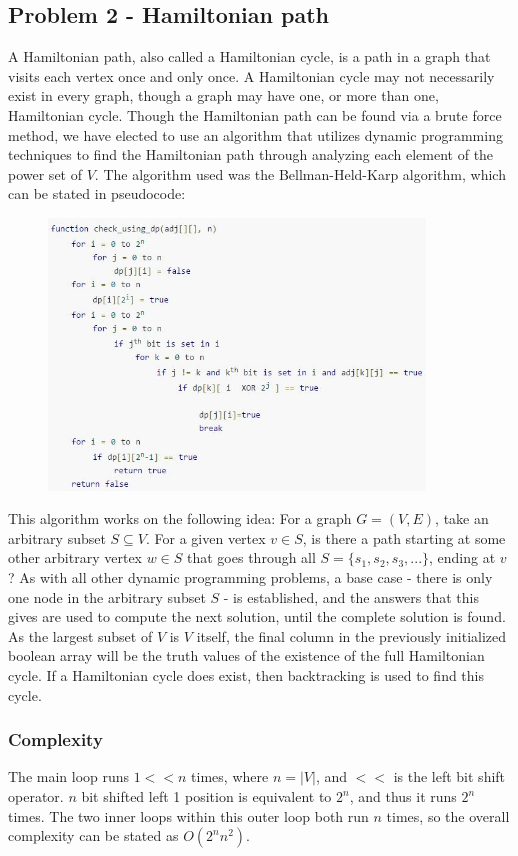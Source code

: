 \documentclass[11pt]{article}
\begin{document}
	\subsection{Problem 2 - Hamiltonian path}
	A Hamiltonian path, also called a Hamiltonian cycle, is a path in a graph that visits each vertex once and only once. A Hamiltonian cycle may not necessarily exist in every graph, though a graph may have one, or more than one, Hamiltonian cycle. Though the Hamiltonian path can be found via a brute force method, we have elected to use an algorithm that utilizes dynamic programming techniques to find the Hamiltonian path through analyzing each element of the power set of \(V\). The algorithm used was the Bellman-Held-Karp algorithm, which can be stated in pseudocode: \cite{hamilton} \newpage 
	 \begin{figure}[h!]
	 	\centering
	 	\includegraphics[width=100mm,scale=0.5]{images/Capture.jpg}
	 \end{figure}
 	This algorithm works on the following idea: For a graph \(G = (V,E)\), take an arbitrary subset \(S \subseteq V\). For a given vertex \(v \in S\), is there a path starting at some other arbitrary vertex \(w \in S\) that goes through all \(S = \{s_1,s_2,s_3,...\}\), ending at \(v\)? As with all other dynamic programming problems, a base case - there is only one node in the arbitrary subset \(S\) - is established, and the answers that this gives are used to compute the next solution, until the complete solution is found. As the largest subset of \(V\) is \(V\) itself, the final column in the previously initialized boolean array will be the truth values of the existence of the full Hamiltonian cycle. If a Hamiltonian cycle does exist, then backtracking is used to find this cycle. 
 	\subsubsection{Complexity}
 	The main loop runs \(1<<n\) times, where \(n = |V|\), and \(<<\) is the left bit shift operator. \(n\) bit shifted left 1 position is equivalent to \(2^n\), and thus it runs \(2^n\) times. The two inner loops within this outer loop both run \(n\) times, so the overall complexity can be stated as \(O(2^n n^2)\).
 	\newpage
\end{document}
